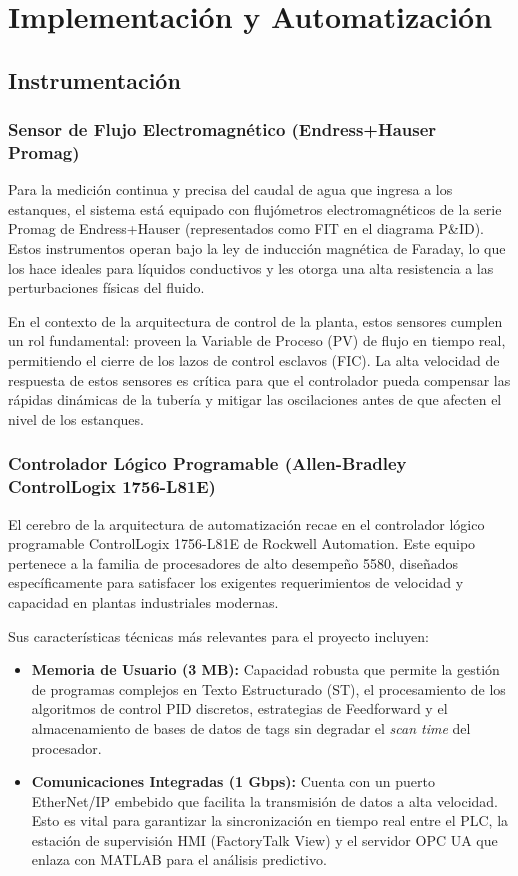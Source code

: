 \section{Implementación y Automatización}
\subsection{Instrumentación}
\subsubsection{Sensor de Flujo Electromagnético (Endress+Hauser Promag)}
Para la medición continua y precisa del caudal de agua que ingresa a los estanques, el sistema está equipado con flujómetros electromagnéticos de la serie Promag de Endress+Hauser (representados como FIT en el diagrama P\&ID). Estos instrumentos operan bajo la ley de inducción magnética de Faraday, lo que los hace ideales para líquidos conductivos y les otorga una alta resistencia a las perturbaciones físicas del fluido.

En el contexto de la arquitectura de control de la planta, estos sensores cumplen un rol fundamental: proveen la Variable de Proceso (PV) de flujo en tiempo real, permitiendo el cierre de los lazos de control esclavos (FIC). La alta velocidad de respuesta de estos sensores es crítica para que el controlador pueda compensar las rápidas dinámicas de la tubería y mitigar las oscilaciones antes de que afecten el nivel de los estanques.

\subsubsection{Controlador Lógico Programable (Allen-Bradley ControlLogix 1756-L81E)}
El cerebro de la arquitectura de automatización recae en el controlador lógico programable ControlLogix 1756-L81E de Rockwell Automation. Este equipo pertenece a la familia de procesadores de alto desempeño 5580, diseñados específicamente para satisfacer los exigentes requerimientos de velocidad y capacidad en plantas industriales modernas.

Sus características técnicas más relevantes para el proyecto incluyen:
\begin{itemize}
    \item \textbf{Memoria de Usuario (3 MB):} Capacidad robusta que permite la gestión de programas complejos en Texto Estructurado (ST), el procesamiento de los algoritmos de control PID discretos, estrategias de Feedforward y el almacenamiento de bases de datos de tags sin degradar el \textit{scan time} del procesador.
    \item \textbf{Comunicaciones Integradas (1 Gbps):} Cuenta con un puerto EtherNet/IP embebido que facilita la transmisión de datos a alta velocidad. Esto es vital para garantizar la sincronización en tiempo real entre el PLC, la estación de supervisión HMI (FactoryTalk View) y el servidor OPC UA que enlaza con MATLAB para el análisis predictivo.
\end{itemize}

